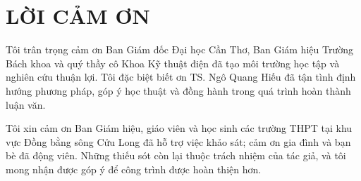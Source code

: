 \chapter*{LỜI CẢM ƠN}
Tôi trân trọng cảm ơn Ban Giám đốc Đại học Cần Thơ, Ban Giám hiệu Trường Bách khoa và quý thầy cô Khoa Kỹ thuật điện đã tạo môi trường học tập và nghiên cứu thuận lợi. Tôi đặc biệt biết ơn TS. Ngô Quang Hiếu đã tận tình định hướng phương pháp, góp ý học thuật và đồng hành trong quá trình hoàn thành luận văn.

Tôi xin cảm ơn Ban Giám hiệu, giáo viên và học sinh các trường THPT tại khu vực Đồng bằng sông Cửu Long đã hỗ trợ việc khảo sát; cảm ơn gia đình và bạn bè đã động viên. Những thiếu sót còn lại thuộc trách nhiệm của tác giả, và tôi mong nhận được góp ý để công trình được hoàn thiện hơn.
